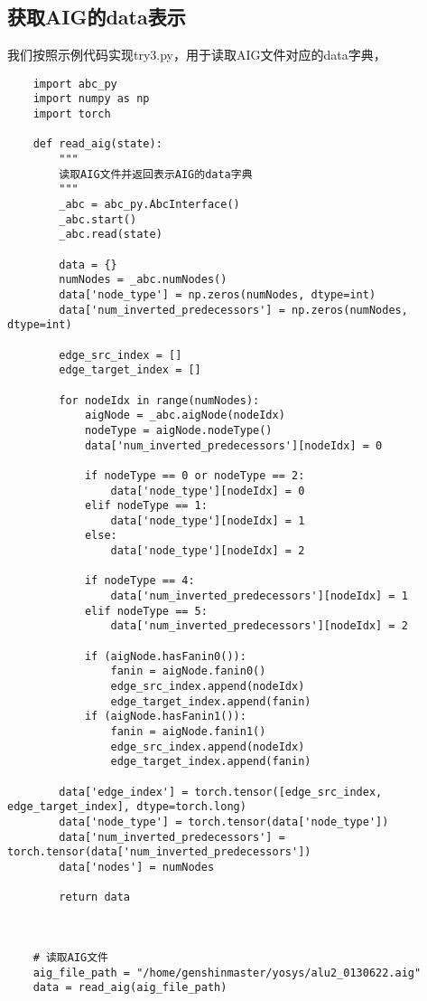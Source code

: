 \documentclass[UTF8]{ctexart}
\begin{document}
\subsection{获取AIG的data表示}
我们按照示例代码实现try3.py，用于读取AIG文件对应的data字典，
\begin{lstlisting}
    import abc_py
    import numpy as np
    import torch
    
    def read_aig(state):
        """
        读取AIG文件并返回表示AIG的data字典
        """
        _abc = abc_py.AbcInterface()
        _abc.start()
        _abc.read(state)
    
        data = {}
        numNodes = _abc.numNodes()
        data['node_type'] = np.zeros(numNodes, dtype=int)
        data['num_inverted_predecessors'] = np.zeros(numNodes, dtype=int)
    
        edge_src_index = []
        edge_target_index = []
    
        for nodeIdx in range(numNodes):
            aigNode = _abc.aigNode(nodeIdx)
            nodeType = aigNode.nodeType()
            data['num_inverted_predecessors'][nodeIdx] = 0
    
            if nodeType == 0 or nodeType == 2:
                data['node_type'][nodeIdx] = 0
            elif nodeType == 1:
                data['node_type'][nodeIdx] = 1
            else:
                data['node_type'][nodeIdx] = 2
    
            if nodeType == 4:
                data['num_inverted_predecessors'][nodeIdx] = 1
            elif nodeType == 5:
                data['num_inverted_predecessors'][nodeIdx] = 2
    
            if (aigNode.hasFanin0()):
                fanin = aigNode.fanin0()
                edge_src_index.append(nodeIdx)
                edge_target_index.append(fanin)
            if (aigNode.hasFanin1()):
                fanin = aigNode.fanin1()
                edge_src_index.append(nodeIdx)
                edge_target_index.append(fanin)
    
        data['edge_index'] = torch.tensor([edge_src_index, edge_target_index], dtype=torch.long)
        data['node_type'] = torch.tensor(data['node_type'])
        data['num_inverted_predecessors'] = torch.tensor(data['num_inverted_predecessors'])
        data['nodes'] = numNodes
    
        return data
        
        
        
    # 读取AIG文件
    aig_file_path = "/home/genshinmaster/yosys/alu2_0130622.aig"
    data = read_aig(aig_file_path)
    

\end{lstlisting}
\end{document}
